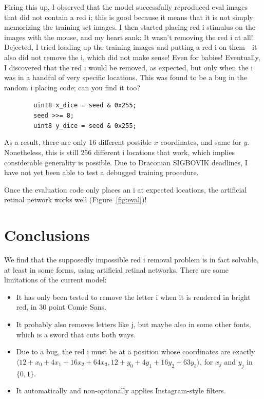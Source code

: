 \documentclass[twocolumn]{article}
\begin{document}
Firing this up, I observed that the model successfully reproduced eval
images that did not contain a red i; this is good because it means
that it is not simply memorizing the training set images. I then
started placing red i stimulus on the images with the mouse, and my
heart sank: It wasn't removing the red i at all! Dejected, I tried
loading up the training images and putting a red i on them---it also
did not remove the i, which did not make sense! Even for babies!
Eventually, I discovered that the red i would be removed, as expected,
but only when the i was in a handful of very specific locations. This
was found to be a bug in the random i placing code; can you find it too?

\smallskip
\noindent \verb+        uint8 x_dice = seed & 0x255;+ \\
          \verb+        seed >>= 8;+ \\
          \verb+        uint8 y_dice = seed & 0x255;+
\smallskip

As a result, there are only 16 different possible $x$ coordinates, and same
for $y$. Nonetheless, this is still 256 different i locations that work,
which implies considerable generality is possible. Due to Draconian SIGBOVIK
deadlines, I have not yet been able to test a debugged training procedure.

Once the evaluation code only places an i at expected locations, the artificial
retinal network works well (Figure~\ref{fig:eval})!


\section{Conclusions}

We find that the supposedly impossible red i removal problem is in
fact solvable, at least in some forms, using artificial retinal
networks. There are some limitations of the current model:
\begin{itemize}
\item It has only been tested to remove the letter i when it is rendered
  in bright red, in 30 point Comic Sans.
\item It probably also removes letters like j, but maybe also in some
  other fonts, which is a sword that cuts both ways.
\item Due to a bug, the red i must be at a position whose coordinates are exactly
  $\langle 12 + x_0 + 4x_1 + 16x_2 + 64x_3, 12 + y_0 + 4y_1 + 16y_2 + 63y_3 \rangle$,
for $x_j$ and $y_j$ in $\{0, 1\}$.
\item It automatically and non-optionally applies Instagram-style filters.
\end{itemize}
\end{document}
